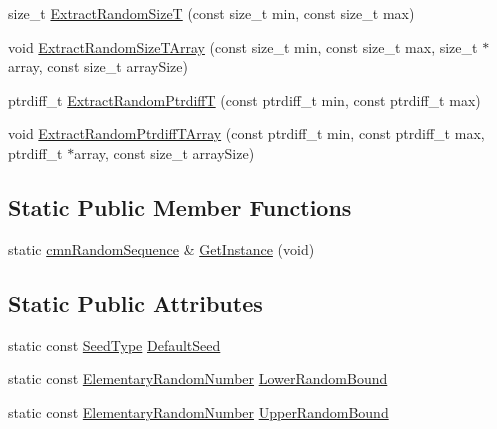 {\bf }\par
\begin{DoxyCompactItemize}
\item 
size\-\_\-t \hyperlink{classcmn_random_sequence_aa6ae8a700426d8a9e54397606869cfd1}{Extract\-Random\-Size\-T} (const size\-\_\-t min, const size\-\_\-t max)
\item 
void \hyperlink{classcmn_random_sequence_a0df72fb25b3bcaa2c29ebe278a514e5c}{Extract\-Random\-Size\-T\-Array} (const size\-\_\-t min, const size\-\_\-t max, size\-\_\-t $\ast$array, const size\-\_\-t array\-Size)
\item 
ptrdiff\-\_\-t \hyperlink{classcmn_random_sequence_adaeaead34d142d5647cc2e30a42478f4}{Extract\-Random\-Ptrdiff\-T} (const ptrdiff\-\_\-t min, const ptrdiff\-\_\-t max)
\item 
void \hyperlink{classcmn_random_sequence_ae0c9403c678ab3708fe5b8eddb0bd423}{Extract\-Random\-Ptrdiff\-T\-Array} (const ptrdiff\-\_\-t min, const ptrdiff\-\_\-t max, ptrdiff\-\_\-t $\ast$array, const size\-\_\-t array\-Size)
\end{DoxyCompactItemize}

\subsection*{Static Public Member Functions}
\begin{DoxyCompactItemize}
\item 
static \hyperlink{classcmn_random_sequence}{cmn\-Random\-Sequence} \& \hyperlink{classcmn_random_sequence_a04c1fb832acf6755cb954b4582ec6419}{Get\-Instance} (void)
\end{DoxyCompactItemize}
\subsection*{Static Public Attributes}
\begin{DoxyCompactItemize}
\item 
static const \hyperlink{classcmn_random_sequence_a7b97009536ce38559fa5fb86a9eea16d}{Seed\-Type} \hyperlink{classcmn_random_sequence_aa189e86aad2a764fa2faa67732c1b168}{Default\-Seed}
\item 
static const \hyperlink{classcmn_random_sequence_a4728645d25009df6b70fd0db6340f92f}{Elementary\-Random\-Number} \hyperlink{classcmn_random_sequence_a3b9788523fe79f42e53a0331355cd73e}{Lower\-Random\-Bound}
\item 
static const \hyperlink{classcmn_random_sequence_a4728645d25009df6b70fd0db6340f92f}{Elementary\-Random\-Number} \hyperlink{classcmn_random_sequence_a42566669e8703c6846ce41e286f62e67}{Upper\-Random\-Bound}
\end{DoxyCompactItemize}
